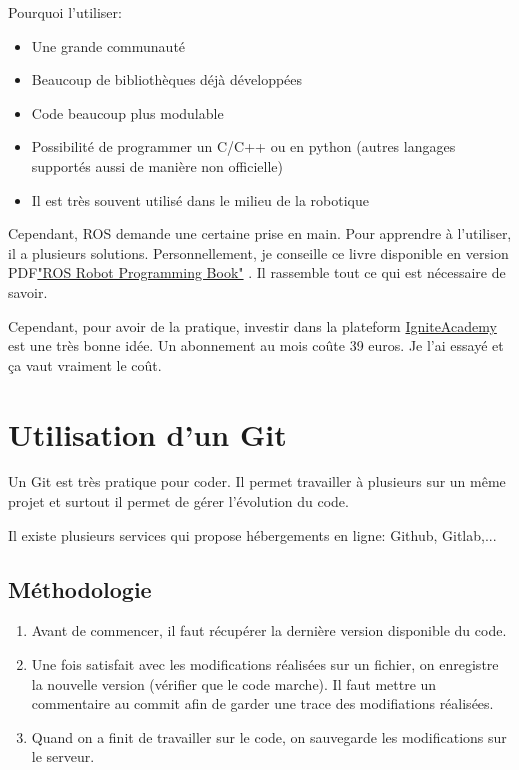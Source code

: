 \documentclass[a4paper, 11pt]{report}
\begin{document}
Pourquoi l'utiliser:
\begin{itemize}
\item Une grande communauté
\item Beaucoup de bibliothèques déjà développées
\item Code beaucoup plus modulable
\item Possibilité de programmer un C/C++ ou en python (autres langages supportés aussi de manière non officielle)
\item Il est très souvent utilisé dans le milieu de la robotique
\end{itemize}

Cependant, ROS demande une certaine prise en main. Pour apprendre à l'utiliser, il a plusieurs solutions. Personnellement, je conseille ce livre disponible en version PDF\href{https://community.robotsource.org/t/download-the-ros-robot-programming-book-for-free/51}{"ROS Robot Programming Book"} . Il rassemble tout ce qui est nécessaire de savoir.

Cependant, pour avoir de la pratique, investir dans la plateform \href{https://www.robotigniteacademy.com/en/}{IgniteAcademy} est une très bonne idée. Un abonnement au mois coûte 39 euros. Je l'ai essayé et ça vaut vraiment le coût.

\chapter{Utilisation d'un Git}
Un Git est très pratique pour coder. Il permet travailler à plusieurs sur un même projet et surtout il permet de gérer l'évolution du code.

Il existe plusieurs services qui propose hébergements en ligne: Github, Gitlab,...  

\section{Méthodologie}

\begin{enumerate}
\item Avant de commencer, il faut récupérer la dernière version disponible du code.
\item Une fois satisfait avec les modifications réalisées sur un fichier, on enregistre la nouvelle version (vérifier que le code marche). Il faut mettre un commentaire au commit afin de garder une trace des modifiations réalisées.
\item Quand on a finit de travailler sur le code, on sauvegarde les modifications sur le serveur.
\end{enumerate}
\end{document}

